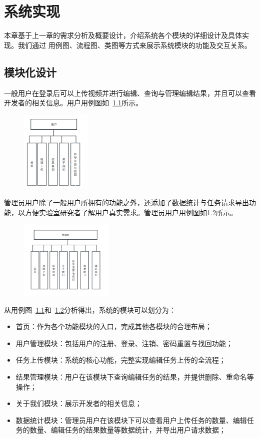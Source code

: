 \chapter{系统实现}

本章基于上一章的需求分析及概要设计，介绍系统各个模块的详细设计及具体实现。我们通过
用例图、流程图、类图等方式来展示系统模块的功能及交互关系。

\section{模块化设计}

一般用户在登录后可以上传视频并进行编辑、查询与管理编辑结果，并且可以查看开发者的相关信息。用户用例图如~\ref{fig:user-uml}所示。
\begin{figure}[ht]
    \centering
    \includegraphics[width=0.3\textwidth]{source/img/user_uml.png}
    \label{fig:user-uml}
\end{figure}
管理员用户除了一般用户所拥有的功能之外，还添加了数据统计与任务请求导出功能，以方便实验室研究者了解用户真实需求。管理员用户用例图如\ref{fig:admin-uml}所示。
\begin{figure}[ht]
    \centering
    \includegraphics[width=0.4\textwidth]{source/img/admin_uml.png}
    \label{fig:admin-uml}
\end{figure}

从用例图~\ref{fig:user-uml}和~\ref{fig:admin-uml}分析得出，系统的模块可以划分为：
\begin{itemize}
    \item 首页：作为各个功能模块的入口，完成其他各模块的合理布局；
    \item 用户管理模块：包括用户的注册、登录、注销、密码重置与找回功能；
    \item 任务上传模块：系统的核心功能，完整实现编辑任务上传的全流程；
    \item 结果管理模块：用户在该模块下查询编辑任务的结果，并提供删除、重命名等操作；
    \item 关于我们模块：展示开发者的相关信息；
    \item 数据统计模块：管理员用户在该模块下可以查看用户上传任务的数量、编辑任务的数量、编辑任务的结果数量等数据统计，并导出用户请求数据；
\end{itemize}

